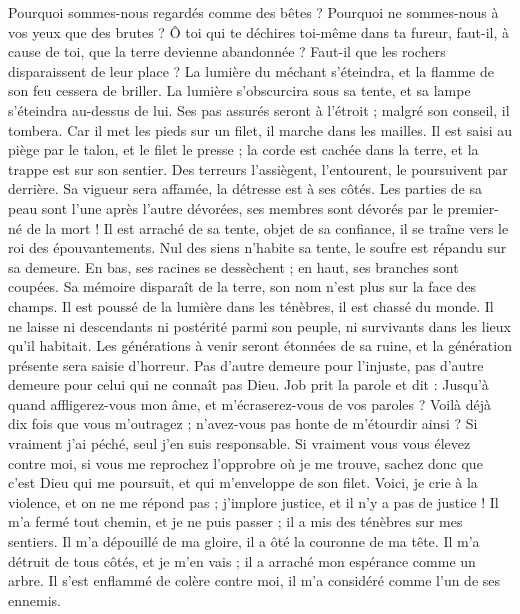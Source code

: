 \begin{multicols}{2}
Pourquoi sommes-nous regardés comme des bêtes ? Pourquoi ne sommes-nous à vos yeux que des brutes ?
Ô toi qui te déchires toi-même dans ta fureur, faut-il, à cause de toi, que la terre devienne abandonnée ? Faut-il que les rochers disparaissent de leur place ?
La lumière du méchant s'éteindra, et la flamme de son feu cessera de briller.
La lumière s'obscurcira sous sa tente, et sa lampe s'éteindra au-dessus de lui.
Ses pas assurés seront à l'étroit ; malgré son conseil, il tombera.
Car il met les pieds sur un filet, il marche dans les mailles.
Il est saisi au piège par le talon, et le filet le presse ;
la corde est cachée dans la terre, et la trappe est sur son sentier.
Des terreurs l'assiègent, l'entourent, le poursuivent par derrière.
Sa vigueur sera affamée, la détresse est à ses côtés.
Les parties de sa peau sont l'une après l'autre dévorées, ses membres sont dévorés par le premier-né de la mort !
Il est arraché de sa tente, objet de sa confiance, il se traîne vers le roi des épouvantements.
Nul des siens n'habite sa tente, le soufre est répandu sur sa demeure.
En bas, ses racines se dessèchent ; en haut, ses branches sont coupées.
Sa mémoire disparaît de la terre, son nom n'est plus sur la face des champs.
Il est poussé de la lumière dans les ténèbres, il est chassé du monde.
Il ne laisse ni descendants ni postérité parmi son peuple, ni survivants dans les lieux qu'il habitait.
Les générations à venir seront étonnées de sa ruine, et la génération présente sera saisie d'horreur.
Pas d'autre demeure pour l'injuste, pas d'autre demeure pour celui qui ne connaît pas Dieu.
\VerseOne{}Job prit la parole et dit :
Jusqu’à quand affligerez-vous mon âme, et m'écraserez-vous de vos paroles ?
Voilà déjà dix fois que vous m'outragez ; n'avez-vous pas honte de m'étourdir ainsi ?
Si vraiment j'ai péché, seul j'en suis responsable.
Si vraiment vous vous élevez contre moi, si vous me reprochez l'opprobre où je me trouve,
sachez donc que c'est Dieu qui me poursuit, et qui m'enveloppe de son filet.
Voici, je crie à la violence, et on ne me répond pas ; j'implore justice, et il n'y a pas de justice !
Il m'a fermé tout chemin, et je ne puis passer ; il a mis des ténèbres sur mes sentiers.
Il m'a dépouillé de ma gloire, il a ôté la couronne de ma tête.
Il m'a détruit de tous côtés, et je m'en vais ; il a arraché mon espérance comme un arbre.
Il s'est enflammé de colère contre moi, il m'a considéré comme l'un de ses ennemis.

\end{multicols}
